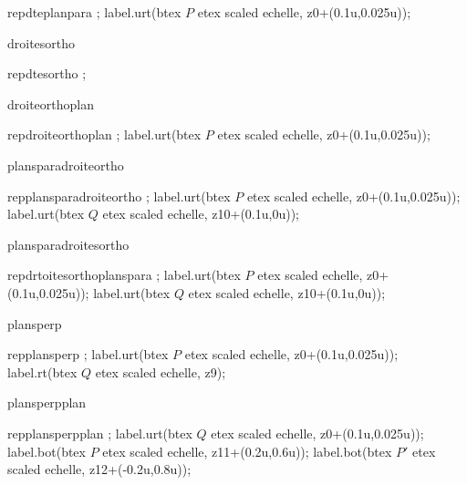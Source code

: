 {{{			\begin{mpost}[mpsettings={u=\scaleminischemspace*1cm;echelle=\scaleminischemspace;}]
				repdteplanpara ;
				label.urt(btex $P$ etex scaled echelle, z0+(0.1u,0.025u));
			\end{mpost}
		}%
		{droitesortho}{%
			\begin{mpost}[mpsettings={u=\scaleminischemspace*1cm;echelle=\scaleminischemspace;}]
				repdtesortho ;
			\end{mpost}
		}%
		{droiteorthoplan}{%
			\begin{mpost}[mpsettings={u=\scaleminischemspace*1cm;echelle=\scaleminischemspace;}]
				repdroiteorthoplan ;
				label.urt(btex $P$ etex scaled echelle, z0+(0.1u,0.025u));
			\end{mpost}
		}%
		{plansparadroiteortho}{%
			\begin{mpost}[mpsettings={u=\scaleminischemspace*1cm;echelle=\scaleminischemspace;}]
				repplansparadroiteortho ;
				label.urt(btex $P$ etex scaled echelle, z0+(0.1u,0.025u));
				label.urt(btex $Q$ etex scaled echelle, z10+(0.1u,0u));
			\end{mpost}
		}%
		{plansparadroitesortho}{%
			\begin{mpost}[mpsettings={u=\scaleminischemspace*1cm;echelle=\scaleminischemspace;}]
				repdrtoitesorthoplanspara ;
				label.urt(btex $P$ etex scaled echelle, z0+(0.1u,0.025u));
				label.urt(btex $Q$ etex scaled echelle, z10+(0.1u,0u));
			\end{mpost}
		}%
		{plansperp}{%
			\begin{mpost}[mpsettings={u=\scaleminischemspace*1cm;echelle=\scaleminischemspace;}]
				repplansperp ;
				label.urt(btex $P$ etex scaled echelle, z0+(0.1u,0.025u));
				label.rt(btex $Q$ etex scaled echelle, z9);
			\end{mpost}
		}%
		{plansperpplan}{%
			\begin{mpost}[mpsettings={u=\scaleminischemspace*1cm;echelle=\scaleminischemspace;}]
				repplansperpplan ;
				label.urt(btex $Q$ etex scaled echelle, z0+(0.1u,0.025u));
				label.bot(btex $P$ etex scaled echelle, z11+(0.2u,0.6u));
				label.bot(btex $P'$ etex scaled echelle, z12+(-0.2u,0.8u));
			\end{mpost}
		}%
	}%
	\fi
}

\endinput